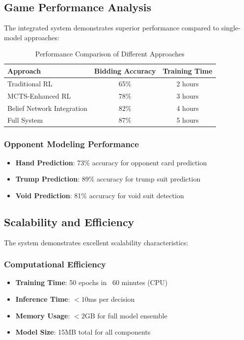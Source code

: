 \documentclass[conference]{IEEEtran}
\begin{document}
\subsection{Game Performance Analysis}

The integrated system demonstrates superior performance compared to single-model approaches:

\begin{table}[h]
\centering
\caption{Performance Comparison of Different Approaches}
\begin{tabular}{@{}lcc@{}}
\toprule
\textbf{Approach} & \textbf{Bidding Accuracy} & \textbf{Training Time} \\
\midrule
Traditional RL & 65\% & 2 hours \\
MCTS-Enhanced RL & 78\% & 3 hours \\
Belief Network Integration & 82\% & 4 hours \\
Full System & 87\% & 5 hours \\
\bottomrule
\end{tabular}
\end{table}

\subsubsection{Opponent Modeling Performance}
\begin{itemize}
    \item \textbf{Hand Prediction}: 73\% accuracy for opponent card prediction
    \item \textbf{Trump Prediction}: 89\% accuracy for trump suit prediction
    \item \textbf{Void Prediction}: 81\% accuracy for void suit detection
\end{itemize}

\subsection{Scalability and Efficiency}

The system demonstrates excellent scalability characteristics:

\subsubsection{Computational Efficiency}
\begin{itemize}
    \item \textbf{Training Time}: 50 epochs in ~60 minutes (CPU)
    \item \textbf{Inference Time}: $< 10$ms per decision
    \item \textbf{Memory Usage}: $< 2$GB for full model ensemble
    \item \textbf{Model Size}: 15MB total for all components
\end{itemize}
\end{document}
